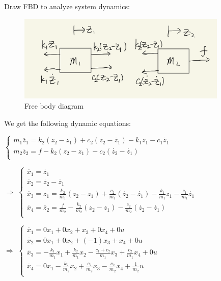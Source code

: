Draw FBD to analyze system dynamics: 
\begin{figure}[htp]
    \centering
    \includegraphics[width=10cm]{images/Q2_FBD.png}
    \caption{Free body diagram}
    \label{fig:Q2FBD}
\end{figure}

We get the following dynamic equations:

$\left\{
    \begin{array}{lr}
    m_1\ddot{z_1} = k_2(z_2 - z_1) + c_2(\dot{z_2} - \dot{z_1}) - k_1z_1 -c_1\dot{z_1}\\
    m_2\ddot{z_2} = f - k_2(z_2 - z_1) - c_2(\dot{z_2} - \dot{z_1})\\
    \end{array}
\right.$ 

$\Rightarrow $
$\left\{
    \begin{array}{lr}
    \dot{x_1} = \dot{z_1} \\ 
    \dot{x_2} = \dot{z_2} - \dot{z_1}\\
    \dot{x_3} = \ddot{z_1} = \frac{k_2}{m_1} (z_2 - z_1) + \frac{c_2}{m_1}(\dot{z_2} - \dot{z_1}) - \frac{k_1}{m_1}z_1 -\frac{c_1}{m_1}\dot{z_1}\\
    \dot{x_4} = \ddot{z_2} = \frac{f}{m_2} - \frac{k_2}{m_2}(z_2 - z_1) - \frac{c_2}{m_2}(\dot{z_2} - \dot{z_1})\\
    \end{array}
\right.$

$\Rightarrow $
$\left\{
    \begin{array}{lr}
    \dot{x_1} = 0x_1 + 0x_2 + x_3 + 0x_4 + 0u \\ 
    \dot{x_2} = 0x_1 + 0x_2 + (-1)x_3 + x_4 + 0u \\
    \dot{x_3} = - \frac{k_1}{m_1}x_1 + \frac{k_2}{m_1} x_2 - \frac{c_1+c_2}{m_1}x_3 + \frac{c_2}{m_1}x_4 + 0u\\
    \dot{x_4} = 0x_1 - \frac{k_2}{m_2}x_2 + \frac{c_2}{m_2}x_3 - \frac{c_2}{m_2}x_4 + \frac{1}{m_2}u\\
    \end{array}
\right.$

